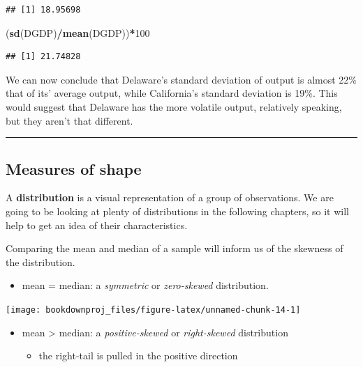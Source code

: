 \documentclass[
]{book}
\newenvironment{Shaded}{\begin{snugshade}}{\end{snugshade}}
\newcommand{\DecValTok}[1]{\textcolor[rgb]{0.00,0.00,0.81}{#1}}
\newcommand{\FunctionTok}[1]{\textcolor[rgb]{0.13,0.29,0.53}{\textbf{#1}}}
\newcommand{\NormalTok}[1]{#1}
\newcommand{\SpecialCharTok}[1]{\textcolor[rgb]{0.81,0.36,0.00}{\textbf{#1}}}
\providecommand{\tightlist}{%
  \setlength{\itemsep}{0pt}\setlength{\parskip}{0pt}}
\begin{document}
\begin{verbatim}
## [1] 18.95698
\end{verbatim}

\begin{Shaded}
\begin{Highlighting}[]
\NormalTok{(}\FunctionTok{sd}\NormalTok{(DGDP)}\SpecialCharTok{/}\FunctionTok{mean}\NormalTok{(DGDP))}\SpecialCharTok{*}\DecValTok{100}
\end{Highlighting}
\end{Shaded}

\begin{verbatim}
## [1] 21.74828
\end{verbatim}

We can now conclude that Delaware's standard deviation of output is almost 22\% that of its' average output, while California's standard deviation is 19\%. This would suggest that Delaware has the more volatile output, relatively speaking, but they aren't that different.

\begin{center}\rule{0.5\linewidth}{0.5pt}\end{center}

\subsection{Measures of shape}\label{measures-of-shape}

A \textbf{distribution} is a visual representation of a group of observations. We are going to be looking at plenty of distributions in the following chapters, so it will help to get an idea of their characteristics.

Comparing the mean and median of a sample will inform us of the skewness of the distribution.

\begin{itemize}
\tightlist
\item
  mean = median: a \emph{symmetric} or \emph{zero-skewed} distribution.
\end{itemize}

\begin{center}\texttt{[image: bookdownproj\_files/figure-latex/unnamed-chunk-14-1]} \end{center}

\begin{itemize}
\item
  mean \textgreater{} median: a \emph{positive-skewed} or \emph{right-skewed} distribution

  \begin{itemize}
  \tightlist
  \item
    the right-tail is pulled in the positive direction
  \end{itemize}
\end{itemize}
\end{document}
